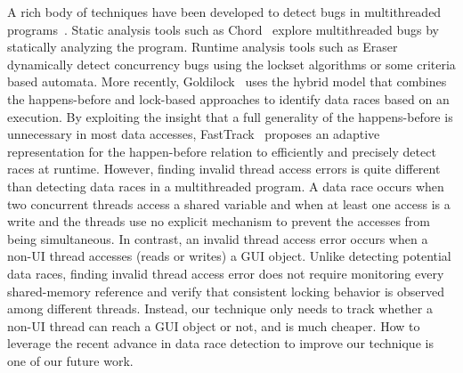 A rich body of techniques have been developed to detect bugs in multithreaded programs~\cite{Huang:2011:PPC:2001420.2001438, Weeratunge:2010, Huang:2011:EST}.
Static analysis tools such as Chord~\cite{Naik:2006}
 explore multithreaded bugs by statically analyzing the program. Runtime
analysis tools such as Eraser~\cite{Savage:1997}  dynamically detect concurrency bugs using the lockset
algorithms or some criteria based automata. 
More recently, Goldilock~\cite{Elmas:2007} uses the hybrid model that combines the happens-before and lock-based
approaches to identify data races based on an execution. By exploiting the insight
that a full generality of the happens-before is unnecessary in most data accesses,
FastTrack~\cite{Flanagan:2009} proposes an adaptive representation for the happen-before
relation to efficiently and precisely detect races at runtime. However, finding
invalid thread access errors is quite different than detecting data races in
a multithreaded program. A data race occurs when two concurrent threads access
a shared variable and when at least one access is a write and the threads
use no explicit mechanism to prevent the accesses from being simultaneous. In contrast,
an invalid thread access error occurs when a non-UI thread accesses (reads or writes) a GUI object.
Unlike detecting potential data races, finding invalid thread access error does not require monitoring every shared-memory
reference and verify that consistent locking behavior is observed among different threads. Instead,
our technique only needs to track whether a non-UI thread can reach a GUI object or not,
and is much cheaper.
How to leverage the recent advance in data race detection to 
improve our technique is one of our future work.



